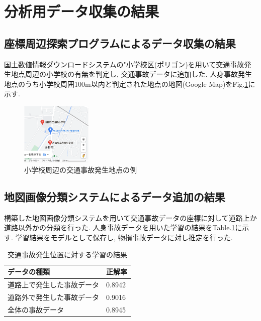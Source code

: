 \documentclass[a4j,8.5pt, twocolumn,fleqn]{jbook}
\begin{document}
\section{分析用データ収集の結果}
\subsection{座標周辺探索プログラムによるデータ収集の結果}
国土数値情報ダウンロードシステムの"小学校区(ポリゴン)を用いて交通事故発生地点周辺の小学校の有無を判定し, 交通事故データに追加した. 
人身事故発生地点のうち小学校周囲100m以内と判定された地点の地図(Google Map)をFig.\ref{shougakkou_gmap}に示す. 

\begin{figure}[htb]
    \centering
    \includegraphics[height=30mm]{images/shougakkou_gmap.png}
    \vspace{-3mm}
    \caption{小学校周辺の交通事故発生地点の例}
    \label{shougakkou_gmap}
\end{figure}

\subsection{地図画像分類システムによるデータ追加の結果}
構築した地図画像分類システムを用いて交通事故データの座標に対して道路上か道路以外かの分類を行った. 
人身事故データを用いた学習の結果をTable.\ref{table_road}に示す. 
学習結果をモデルとして保存し, 物損事故データに対し推定を行った. 


\begin{table}[htb]
    \centering
    \caption{交通事故発生位置に対する学習の結果}
    \label{table_road}
    \begin{tabular}{|l|l|}
        \hline
        \textbf{データの種類} & \textbf{正解率} \\ \hline
        道路上で発生した事故データ   & 0.8942       \\ \hline
        道路外で発生した事故データ   & 0.9016       \\ \hline
        全体の事故データ        & 0.8945       \\ \hline
    \end{tabular}
\end{table}
\end{document}
